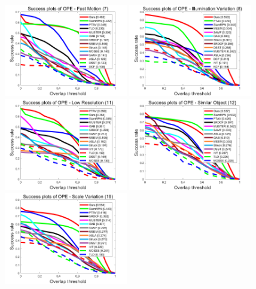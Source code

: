 \begin{figure}[t!]
\begin{center}
	\includegraphics[width=0.48\textwidth]{Img/globally/UAV20L/FM_overlap_OPE_AUC.png}
	\includegraphics[width=0.48\textwidth]{Img/globally/UAV20L/IV_overlap_OPE_AUC.png}
	\includegraphics[width=0.48\textwidth]{Img/globally/UAV20L/LR_overlap_OPE_AUC.png}
	\includegraphics[width=0.48\textwidth]{Img/globally/UAV20L/SOB_overlap_OPE_AUC.png}
	\includegraphics[width=0.48\textwidth]{Img/globally/UAV20L/SV_overlap_OPE_AUC.png}

\end{center}
\end{figure}
